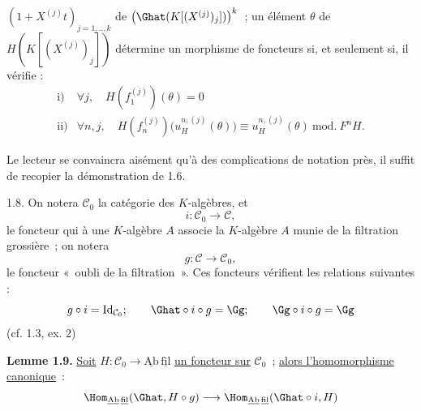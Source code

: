 
\((1+X^{(j)}t)_{j=1,..,k}\) de \(\bigl(\Ghat(K[(X^{(j)})_j])\bigr)^k\)~; un
élément \(\theta\) de \(H(K[(X^{(j)})_j])\) détermine un morphisme de foncteurs si, et seulement si, il vérifie :
\[
\begin{array}{ll}
\text{i)}& \forall j,\quad H(f_1^{(j)})(\theta)=0\\[0.3em]
\text{ii)}& \forall n,j,\quad
H(f_n^{(j)})\bigl(u_H^{n,(j)}(\theta)\bigr)
\equiv u_H^{n,(j)}(\theta)\ \mathrm{mod.}\ F^nH.
\end{array}
\]

Le lecteur se convaincra aisément qu'à des complications de notation près, il suffit de recopier la démonstration de 1.6.

1.8. On notera \(\mathcal C_0\) la catégorie des \(K\)-algèbres, et
\[
  i:\mathcal C_0\longrightarrow \mathcal C,
\]
le foncteur qui à une \(K\)-algèbre \(A\) associe la \(K\)-algèbre \(A\) munie de la filtration grossière~; on notera
\[
  g:\mathcal C\longrightarrow\mathcal C_0,
\]
le foncteur «~oubli de la filtration~». Ces foncteurs vérifient les relations suivantes :
\[
  g\circ i=\operatorname{Id}_{\mathcal C_0};\qquad
  \Ghat\circ i\circ g=\Gg;\qquad
  \Gg\circ i\circ g=\Gg
\]
(cf. 1.3, ex. 2)

\textbf{Lemme 1.9.} \uline{Soit} \(H:\mathcal C_0\to\underline{\mathrm{Ab}}\,\underline{\mathrm{fil}}\) \uline{un foncteur sur} \(\mathcal C_0\)~; \uline{alors l'homomorphisme canonique}~:
\[
  \Hom_{\underline{\mathrm{Ab}}\,\underline{\mathrm{fil}}}(\Ghat,H\circ g)
  \longrightarrow
  \Hom_{\underline{\mathrm{Ab}}\,\underline{\mathrm{fil}}}(\Ghat\circ i,H)
\]

